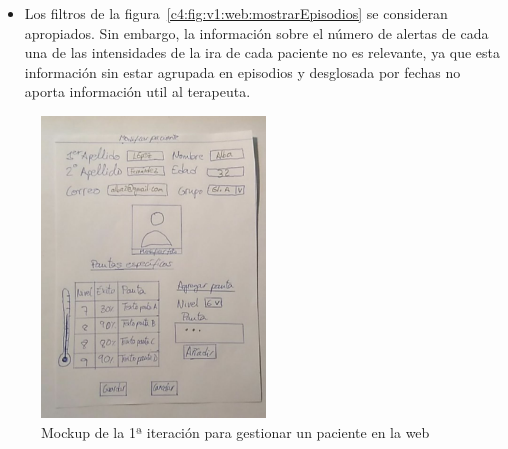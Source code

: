 \begin{itemize}
    
    \item Los filtros de la figura~\ref{c4:fig:v1:web:mostrarEpisodios} se consideran apropiados. Sin embargo, la información sobre el número de alertas de cada una de las intensidades de la ira de cada paciente no es relevante, ya que esta información sin estar agrupada en episodios y desglosada por fechas no aporta información util al terapeuta.
\end{itemize}



\begin{figure}[H]
    \centering
    \includegraphics[width=0.7\linewidth, height=8cm]{Imagenes/04DescProblema/mockups/v1/web/05-modificarPaciente.jpg}
    \caption[Mockup de la 1ª iteración para gestionar un paciente en la web]{Mockup de la 1ª iteración para gestionar un paciente en la web}
    \label{c4:fig:v1:web:gestionarPaciente}
\end{figure}

